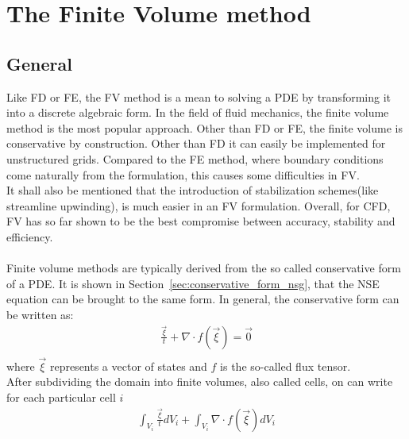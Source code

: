 \documentclass[../main.tex]{subfiles}
\begin{document}
\setlength{\delimitershortfall}{0pt}

\section{The Finite Volume method}
\subsection{General}
Like \ac{FD} or \ac{FE}, the \ac{FV} method is a mean to solving a \ac{PDE} by transforming it into a discrete algebraic form. In the field of fluid mechanics, the finite volume method is the most popular approach. Other than \ac{FD} or \ac{FE}, the finite volume is conservative by construction. Other than \ac{FD} it can easily be implemented for unstructured grids. Compared to the \ac{FE} method, where boundary conditions come naturally from the formulation, this causes some difficulties in \ac{FV}.\\
It shall also be mentioned that the introduction of stabilization schemes(like streamline upwinding), is much easier in an \ac{FV} formulation.
Overall, for \ac{CFD}, \ac{FV} has so far shown to be the best compromise between accuracy, stability and efficiency.
 \\
 \\
Finite volume methods are typically derived from the so called conservative form of a \ac{PDE}. It is shown in Section~\ref{sec:conservative_form_nsg}, that the \ac{NSE} equation can be  brought to the same form. In general, the conservative form can be written as:
\begin{align}
\tfrac{\vec{\xi}}{t}+\nabla\cdot f(\vec{\xi}) = \vec{0} \\
\end{align}
where $\vec{\xi}$ represents a vector of states and $f$ is the so-called flux tensor.\\
After subdividing the domain into finite volumes, also called cells, on can write for each particular cell $i$
\begin{align}
\int_{V_i} \tfrac{\vec{\xi}}{t} dV_i + \int_{V_i} \nabla\cdot f(\vec{\xi}) dV_i
\end{align}
\end{document}
